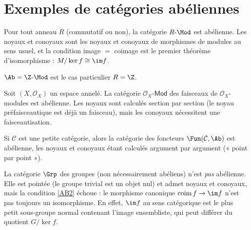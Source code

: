 \section{Exemples de catégories abéliennes}\label{sec:abelian-examples}

\begin{exemple}\label{ex:R-mod-abelian}
Pour tout anneau $R$ (commutatif ou non), la catégorie
$R\text{-}\Mod$ est abélienne. Les noyaux et conoyaux sont les
noyaux et conoyaux de morphismes de modules au sens usuel,
et la condition image $=$ coimage est le premier théorème
d'isomorphisme : $M/\ker f \cong \im f$.
\end{exemple}

\begin{exemple}\label{ex:ab-abelian}
$\Ab = \Z\text{-}\Mod$ est le cas particulier $R = \Z$.
\end{exemple}

\begin{exemple}\label{ex:sheaves-abelian}
Soit $(X, \mathcal{O}_X)$ un espace annelé.
La catégorie $\mathcal{O}_X\text{-}\mathsf{Mod}$ des faisceaux de
$\mathcal{O}_X$-modules est abélienne. Les noyaux sont calculés
section par section (le noyau préfaisceautique
est déjà un faisceau), mais les conoyaux
nécessitent une faisceautisation.
\end{exemple}

\begin{exemple}\label{ex:functor-category-abelian}
Si $\mathcal{C}$ est une petite catégorie, alors la catégorie des foncteurs
$\Fun(\mathcal{C}, \Ab)$ est abélienne,
les noyaux et conoyaux étant calculés argument par argument
(« point par point »).
\end{exemple}

\begin{exemple}\label{ex:grp-not-abelian}
La catégorie $\Grp$ des groupes (non nécessairement abéliens)
n'est \emph{pas} abélienne. Elle est pointée (le groupe trivial
est un objet nul) et admet noyaux et conoyaux, mais la condition
\ref{AB2} échoue : le morphisme canonique
$\operatorname{coim} f \to \im f$ n'est pas toujours un isomorphisme.
En effet, $\im f$ au sens catégorique est le plus petit sous-groupe
normal contenant l'image ensembliste, qui peut différer du quotient
$G/\ker f$.
\end{exemple}


